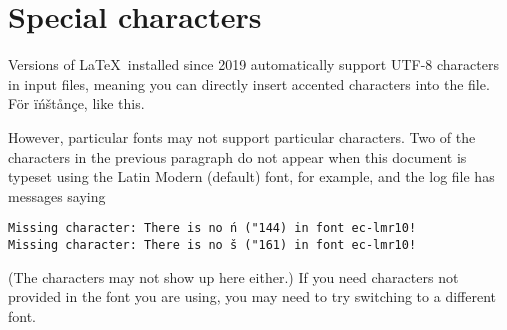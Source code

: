 \section{Special characters}

Versions of \LaTeX\ installed since 2019 automatically support UTF-8 characters
in input files, meaning you can directly insert accented characters into the
file. För ïńštånçe, like this.

However, particular fonts may not support particular characters. Two of the
characters in the previous paragraph do not appear when this document is typeset
using the Latin Modern (default) font, for example, and the log file has
messages saying
\begin{verbatim}
Missing character: There is no ń ("144) in font ec-lmr10!
Missing character: There is no š ("161) in font ec-lmr10!
\end{verbatim}
(The characters may not show up here either.) If you need characters not
provided in the font you are using, you may need to try switching to a different
font.
